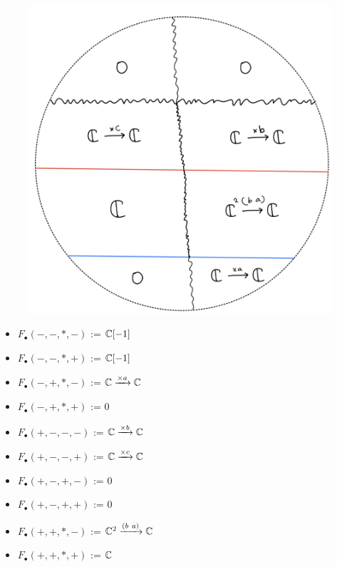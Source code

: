 \begin{figure}[H]
    \centering
    \includegraphics[scale = 0.45]{diagrams/cobord'2/39.png} 
    \caption{}
    \label{fig:your-label}
\end{figure}
\begin{itemize}
\item $F_\bullet(-,-,*,-)$ := $\mathbb{C}[-1]$
\item $F_\bullet(-,-,*,+)$ := $\mathbb{C}[-1]$
\item $F_\bullet(-,+,*,-)$ := $\mathbb{C}\xrightarrow{\times a}\mathbb{C}$
\item $F_\bullet(-,+,*,+)$ := $0$
\item $F_\bullet(+,-,-,-)$ := $\mathbb{C} \xrightarrow{\times b} \mathbb{C} $
\item $F_\bullet(+,-,-,+)$ := $\mathbb{C} \xrightarrow{\times c} \mathbb{C} $
\item $F_\bullet(+,-,+,-)$ := $0$
\item $F_\bullet(+,-,+,+)$ := $0$
\item $F_\bullet(+,+,*,-)$ := $\mathbb{C}^2\xrightarrow{(b~a)}\mathbb{C}$
\item $F_\bullet(+,+,*,+)$ := $\mathbb{C}$
\end{itemize}

